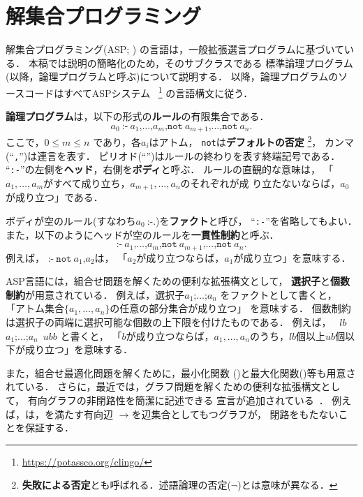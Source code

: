 ﻿%
\section{解集合プログラミング}\label{chap:asp}

解集合プログラミング(ASP; \cite{%
  Baral03:cambridge,%
  Gelfond88:iclp,%
  Inoue08:jssst,%
  Niemela99:amai})
の言語は，一般拡張選言プログラムに基づいている．
本稿では説明の簡略化のため，そのサブクラスである
標準論理プログラム(以降，論理プログラムと呼ぶ)について説明する．
以降，論理プログラムのソースコードはすべてASPシステム
{\clingo}~\footnote{\url{https://potassco.org/clingo/}}
の言語構文に従う．

\textbf{論理プログラム}は，以下の形式の\textbf{ルール}の有限集合である．
\[
  a_0\ \texttt{:-}\
  a_1\texttt{,}\dots\texttt{,}a_m\texttt{,}
  \texttt{not}\ {a_{m+1}}\texttt{,}\dots\texttt{,}\texttt{not}\ {a_n}\texttt{.}
\]
ここで，$0\leq m\leq n$ であり，各$a_i$はアトム，
\texttt{not}は\textbf{デフォルトの否定}
\footnote{\textbf{失敗による否定}とも呼ばれる．述語論理の否定($\neg$)とは意味が異なる．}，
カンマ(``\texttt{,}'')は連言を表す．
ピリオド(``'')はルールの終わりを表す終端記号である．
``\texttt{:-}''の左側を\textbf{ヘッド}，右側を\textbf{ボディ}と呼ぶ．
ルールの直観的な意味は，
「$a_1,\ldots,a_m$がすべて成り立ち，$a_{m+1},\ldots,a_n$のそれぞれが成
り立たないならば，$a_0$が成り立つ」である．

ボディが空のルール(すなわち\(a_0\ \texttt{:-.}\))を\textbf{ファクト}と呼び，
``\texttt{:-}''を省略してもよい．
また，以下のようにヘッドが空のルールを\textbf{一貫性制約}と呼ぶ．
\[
  \texttt{:-} \ a_1\texttt{,}\dots\texttt{,}a_m\texttt{,}
  \texttt{not}\ {a_{m+1}}\texttt{,}\dots\texttt{,}\texttt{not}\ {a_n}\texttt{.}
\]
例えば，
\(\texttt{:-}\ \texttt{not}\ a_1\texttt{,} {a_{2}}\)は，
「$a_2$が成り立つならば，$a_1$が成り立つ」を意味する．

ASP言語には，組合せ問題を解くための便利な拡張構文として，
\textbf{選択子}と\textbf{個数制約}が用意されている．
例えば，選択子\code{\{}\(a_1\texttt{;}\dots\texttt{;}a_n\)\code{\}}
をファクトとして書くと，
「アトム集合\(\{a_1,\dots,a_n\}\)の任意の部分集合が成り立つ」
を意味する．
個数制約は選択子の両端に選択可能な個数の上下限を付けたものである．
例えば，
\ $lb$\ \code{\{}\(a_1\texttt{;}\dots\texttt{;}a_n\)\code{\}}\ $ub$\code{,}$b$
と書くと，
「$b$が成り立つならば，$a_1,\dots,a_n$のうち，$lb$個以上$ub$個以下が成り立つ」を意味する．

また，組合せ最適化問題を解くために，最小化関数
()と最大化関数()等も用意されている．
さらに，最近では，グラフ問題を解くための便利な拡張構文として，
有向グラフの非閉路性を簡潔に記述できる
宣言が追加されている~\cite{bomanson16:acyclicity}．
例えば，は，を満たす有向辺
$\rightarrow$を辺集合としてもつグラフが，
閉路をもたないことを保証する．

